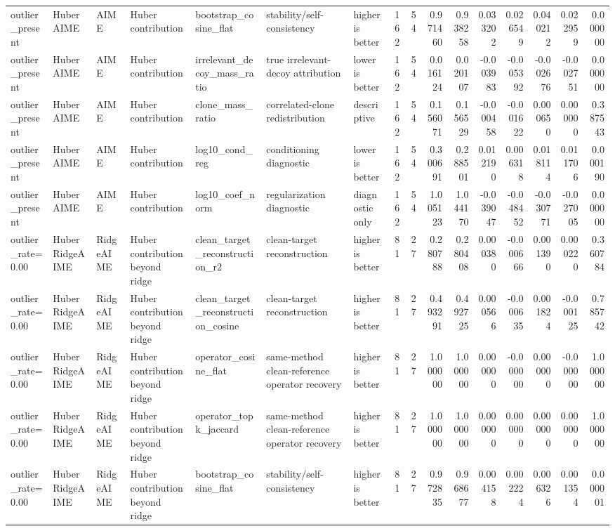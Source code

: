 \begin{table}[t]
\begin{tabular}{lllllllrrrrrrrrr}
outlier_present & HuberAIME & AIME & Huber contribution & bootstrap_cosine_flat & stability/self-consistency & higher is better & 162 & 54 & 0.971460 & 0.938258 & 0.033202 & 0.026549 & 0.040212 & 0.022959 & 0.000000 \\
outlier_present & HuberAIME & AIME & Huber contribution & irrelevant_decoy_mass_ratio & true irrelevant-decoy attribution & lower is better & 162 & 54 & 0.016124 & 0.020107 & -0.003983 & -0.005392 & -0.002676 & -0.002751 & 0.000000 \\
outlier_present & HuberAIME & AIME & Huber contribution & clone_mass_ratio & correlated-clone redistribution & descriptive & 162 & 54 & 0.156071 & 0.156529 & -0.000458 & -0.001622 & 0.000650 & 0.000000 & 0.387543 \\
outlier_present & HuberAIME & AIME & Huber contribution & log10_cond_reg & conditioning diagnostic & lower is better & 162 & 54 & 0.300691 & 0.288501 & 0.012190 & 0.006318 & 0.018114 & 0.011706 & 0.000190 \\
outlier_present & HuberAIME & AIME & Huber contribution & log10_coef_norm & regularization diagnostic & diagnostic only & 162 & 54 & 1.005123 & 1.044170 & -0.039047 & -0.048452 & -0.030771 & -0.027005 & 0.000000 \\
outlier_rate=0.00 & HuberRidgeAIME & RidgeAIME & Huber contribution beyond ridge & clean_target_reconstruction_r2 & clean-target reconstruction & higher is better & 81 & 27 & 0.280788 & 0.280408 & 0.000380 & -0.000666 & 0.001390 & 0.000220 & 0.360784 \\
outlier_rate=0.00 & HuberRidgeAIME & RidgeAIME & Huber contribution beyond ridge & clean_target_reconstruction_cosine & clean-target reconstruction & higher is better & 81 & 27 & 0.493291 & 0.492725 & 0.000566 & -0.000635 & 0.001824 & -0.000125 & 0.785742 \\
outlier_rate=0.00 & HuberRidgeAIME & RidgeAIME & Huber contribution beyond ridge & operator_cosine_flat & same-method clean-reference operator recovery & higher is better & 81 & 27 & 1.000000 & 1.000000 & 0.000000 & -0.000000 & 0.000000 & -0.000000 & 1.000000 \\
outlier_rate=0.00 & HuberRidgeAIME & RidgeAIME & Huber contribution beyond ridge & operator_topk_jaccard & same-method clean-reference operator recovery & higher is better & 81 & 27 & 1.000000 & 1.000000 & 0.000000 & 0.000000 & 0.000000 & 0.000000 & 1.000000 \\
outlier_rate=0.00 & HuberRidgeAIME & RidgeAIME & Huber contribution beyond ridge & bootstrap_cosine_flat & stability/self-consistency & higher is better & 81 & 27 & 0.972835 & 0.968677 & 0.004158 & 0.002224 & 0.006326 & 0.001354 & 0.000001 \\

\end{tabular}
\end{table}
